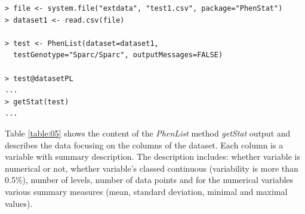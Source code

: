 \documentclass[12pt,a4paper]{article}
\begin{document}
\begingroup
    \fontsize{8pt}{12pt}\selectfont
\begin{verbatim}
> file <- system.file("extdata", "test1.csv", package="PhenStat") 
> dataset1 <- read.csv(file)

> test <- PhenList(dataset=dataset1,
  testGenotype="Sparc/Sparc", outputMessages=FALSE)

> test@datasetPL
...
> getStat(test)
...
\end{verbatim}
\endgroup
Table \ref{table:05} shows the content of the \textit{PhenList} method \textit{getStat} output and describes the data focusing on the columns of the dataset. Each column is a variable with summary description. 
The description includes: whether variable is numerical or not, whether variable's classed continuous (variability is more than 0.5\%), number of levels, number of data points and for the numerical variables various summary measures (mean, standard deviation, minimal and maximal values).
\end{document}
